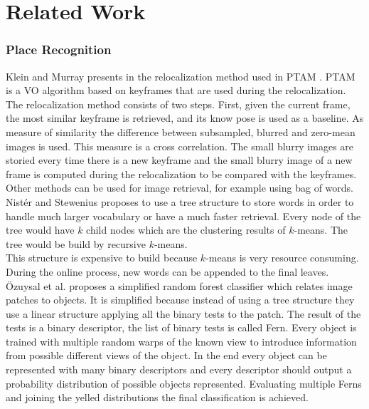 \section{Related Work}\label{sec:related_work}

\subsubsection{Place Recognition}
\label{ssub:place_recognition}


Klein and Murray presents in \cite{Klein2008improving} the relocalization method used in PTAM \cite{KleinMurray2007}. PTAM is a VO algorithm based on keyframes that are used during the relocalization. The relocalization method consists of two steps. First, given the current frame, the most similar keyframe is retrieved, and its know pose is used as a baseline. As measure of similarity the difference between subsampled, blurred and zero-mean images is used. This measure is a cross correlation. The small blurry images are storied every time there is a new keyframe and the small blurry image of a new frame is computed during the relocalization to be compared with the keyframes.\\

Other methods can be used for image retrieval, for example using bag of words. Nist\'er and Stewenius \cite{Nister2006} proposes to use a tree structure to store words in order to handle much larger vocabulary or have a much faster retrieval. Every node of the tree would have $k$ child nodes which are the clustering results of $k$-means. The tree would be build by recursive $k$-means.\\

This structure is expensive to build because $k$-means is very resource consuming. During the online process, new words can be appended to the final leaves.\\

\"Ozuysal et al. \cite{Ozuysal2010} proposes a simplified random forest classifier which relates image patches to objects. It is simplified because instead of using a tree structure they use a linear structure applying all the binary tests to the patch. The result of the tests is a binary descriptor, the list of binary tests is called Fern. Every object is trained with multiple random warps of the known view to introduce information from possible different views of the object. In the end every object can be represented with many binary descriptors and every descriptor should output a probability distribution of possible objects represented. Evaluating multiple Ferns and joining the yelled distributions the final classification is achieved.\\

